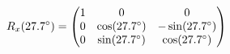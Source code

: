 \documentclass[preview]{standalone}
\begin{document}
\begin{align*}
\special{dvisvgm:raw <g id='unique000'>}R_x(27.7^\circ) = \begin{pmatrix} 1 & 0 & 0 \\ 0 & \cos(27.7^\circ) & -\sin(27.7^\circ) \\ 0 & \sin(27.7^\circ) & \cos(27.7^\circ) \end{pmatrix}\special{dvisvgm:raw </g>}
\end{align*}
\end{document}
